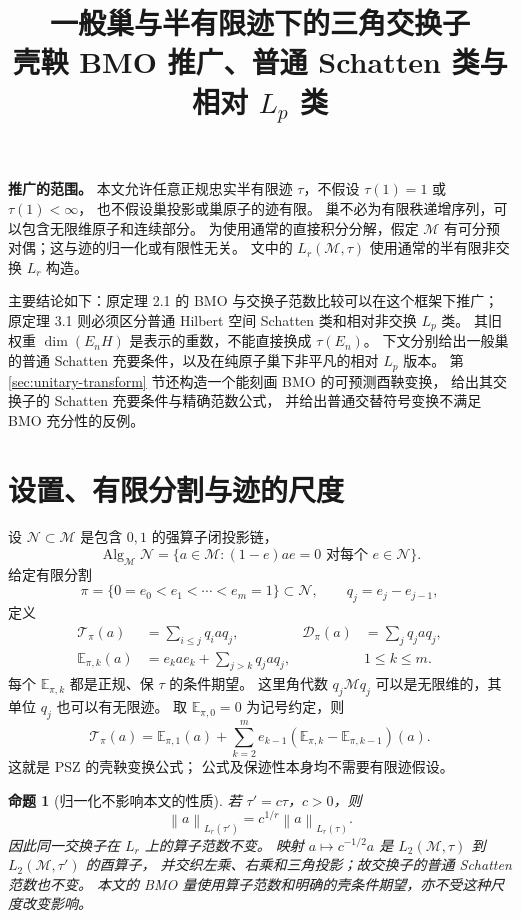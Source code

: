 \documentclass[UTF8,11pt,a4paper,fontset=fandol]{ctexart}
\title{一般巢与半有限迹下的三角交换子\\
\large 壳鞅 BMO 推广、普通 Schatten 类与相对 $L_p$ 类}
\author{}
\date{}
\newtheorem{proposition}[theorem]{命题}
\theoremstyle{remark}
\numberwithin{equation}{section}
\newcommand{\M}{\mathcal M}
\newcommand{\N}{\mathcal N}
\newcommand{\Alg}{\operatorname{Alg}_{\M}\N}
\newcommand{\T}{\mathcal T}
\newcommand{\D}{\mathcal D}
\newcommand{\E}{\mathbb E}
\newcommand{\norm}[1]{\left\lVert #1\right\rVert}
\begin{document}
\maketitle
\vspace{-2em}

\noindent\textbf{推广的范围。}
本文允许任意正规忠实半有限迹 $\tau$，不假设 $\tau(1)=1$ 或 $\tau(1)<\infty$，
也不假设巢投影或巢原子的迹有限。
巢不必为有限秩递增序列，可以包含无限维原子和连续部分。
为使用通常的直接积分分解，假定 $\M$ 有可分预对偶；这与迹的归一化或有限性无关。
文中的 $L_r(\M,\tau)$ 使用通常的半有限非交换 $L_r$ 构造。

主要结论如下：原定理 2.1 的 BMO 与交换子范数比较可以在这个框架下推广；
原定理 3.1 则必须区分普通 Hilbert 空间 Schatten 类和相对非交换 $L_p$ 类。
其旧权重 $\dim(E_nH)$ 是表示的重数，不能直接换成 $\tau(E_n)$。
下文分别给出一般巢的普通 Schatten 充要条件，以及在纯原子巢下非平凡的相对 $L_p$ 版本。
第 \ref{sec:unitary-transform} 节还构造一个能刻画 BMO 的可预测酉鞅变换，
给出其交换子的 Schatten 充要条件与精确范数公式，
并给出普通交替符号变换不满足 BMO 充分性的反例。

\section{设置、有限分割与迹的尺度}

设 $\N\subset\M$ 是包含 $0,1$ 的强算子闭投影链，
\[
 \Alg=\{a\in\M:(1-e)ae=0\text{ 对每个 }e\in\N\}.
\]
给定有限分割
\[
 \pi=\{0=e_0<e_1<\cdots<e_m=1\}\subset\N,
 \qquad q_j=e_j-e_{j-1},
\]
定义
\begin{align}
 \T_\pi(a)&=\sum_{i\leq j}q_i a q_j,
 &\D_\pi(a)&=\sum_jq_j a q_j,\label{eq:finite-triangle}\\
 \E_{\pi,k}(a)&=e_k a e_k+\sum_{j>k}q_j a q_j,
 &&1\leq k\leq m.\label{eq:shell}
\end{align}
每个 $\E_{\pi,k}$ 都是正规、保 $\tau$ 的条件期望。
这里角代数 $q_j\M q_j$ 可以是无限维的，其单位 $q_j$ 也可以有无限迹。
取 $\E_{\pi,0}=0$ 为记号约定，则
\begin{equation}\label{eq:transform}
 \T_\pi(a)=\E_{\pi,1}(a)+
   \sum_{k=2}^m e_{k-1}(\E_{\pi,k}-\E_{\pi,k-1})(a).
\end{equation}
这就是 PSZ \cite[Example 2.6, Proposition 3.4]{PSZ} 的壳鞅变换公式；
公式及保迹性本身均不需要有限迹假设。

\begin{proposition}[归一化不影响本文的性质]\label{prop:scale}
若 $\tau'=c\tau$，$c>0$，则
\[
 \norm a_{L_r(\tau')}=c^{1/r}\norm a_{L_r(\tau)}.
\]
因此同一交换子在 $L_r$ 上的算子范数不变。
映射 $a\mapsto c^{-1/2}a$ 是 $L_2(\M,\tau)$ 到 $L_2(\M,\tau')$ 的酉算子，
并交织左乘、右乘和三角投影；故交换子的普通 Schatten 范数也不变。
本文的 BMO 量使用算子范数和明确的壳条件期望，亦不受这种尺度改变影响。
\end{proposition}
\end{document}
